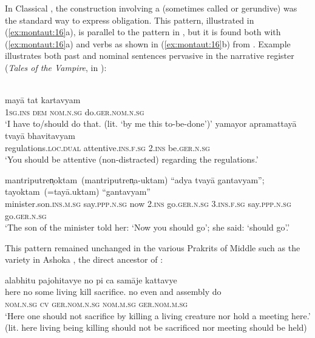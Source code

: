 \documentclass[output=paper]{langsci/langscibook}
\begin{document}
In Classical , the  construction involving a  (sometimes called  or gerundive) was the standard way to express obligation. This pattern, illustrated in (\ref{ex:montaut:16}a), is parallel to the  pattern in , but it is found both with  (\ref{ex:montaut:16}a) and  verbs as shown in (\ref{ex:montaut:16}b) from \citet[31]{Bloch1906}. Example  illustrates both past and  nominal sentences pervasive in the narrative register (\textit{Tales of the Vampire}, in \citealt[59]{Bloch1906}):

\ea\label{ex:montaut:16}
\ea 
{}\\
\gll mayā   tat  kartavyam\\
 \textsc{1sg.ins}    \textsc{dem nom.n.sg}   do.\textsc{ger.nom.n.sg} \\
\glt ‘I have to/should do that. (lit. ‘by me this to-be-done’)’
{\rmfamily} 
\ex 
\gll yamayor  apramattayā         tvayā bhavitavyam\\
regulations.\textsc{loc.dual}    attentive.\textsc{ins.f.sg}  \textsc{2.ins}      be.\textsc{ger.n.sg} \\
\glt ‘You should be attentive (non-distracted) regarding the regulations.’
\z 
\z 

\ea\label{ex:montaut:17} 
\gll mantriputren̩oktam~(mantriputren̩a-uktam)    “adya   tvayā   gantavyam”; tayoktam~(=tayā.uktam) “gantavyam”\\
{minister.son.\textsc{ins.m.sg} say.\textsc{ppp.n.sg}} now \textsc{2.ins}    go.\textsc{ger.n.sg} {\textsc{3.ins.f.sg} say.\textsc{ppp.n.sg}}     go.\textsc{ger.n.sg} \\
\glt ‘The son of the minister told her: ‘Now you should go’; she said: ‘should go’.’
\z

This pattern remained unchanged in the various Prakrits of Middle  such as the  variety in Ashoka , the direct ancestor of : 

\ea
\label{ex:montaut:18}
       alabhitu    pajohitavye    {no pi   ca  samāje}      kattavye\\
  {here no some   living}        kill           sacrifice.  {no even  and assembly}  do \\
\textsc{nom.n.sg}   \textsc{cv}   \textsc{ger.nom.n.sg}          \textsc{nom.m.sg}   \textsc{ger.nom.m.sg} \\
\glt ‘Here one should not sacrifice by killing a living creature nor hold a meeting here.’ \\
  (lit. here living being killing should not be sacrificed nor meeting should be held)
  \z 
  
\end{document}
